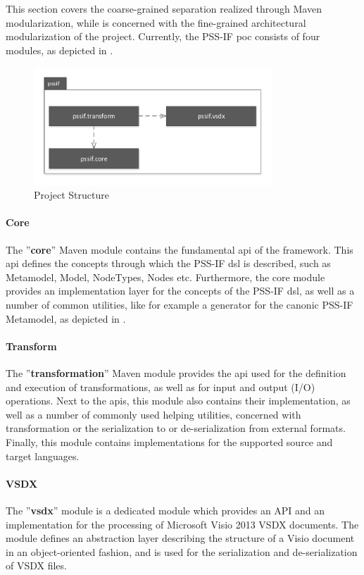 This section covers the coarse-grained separation realized through Maven modularization, while  is concerned with the fine-grained architectural modularization of the project. Currently, the PSS-IF \gls{poc} consists of four modules, as depicted in  .

\begin{figure}
\centering
\includegraphics[width=0.8\textwidth]{figures/project-structure.pdf}
\caption{Project Structure}
\label{fig:structure}
\end{figure}

\paragraph{Core} The ''\textbf{core}'' Maven module contains the fundamental \gls{api} of the framework. This \gls{api} defines the concepts through which the PSS-IF \gls{dsl} is described, such as Metamodel, Model, NodeTypes, Nodes etc. Furthermore, the core module provides an implementation layer for the concepts of the PSS-IF \gls{dsl}, as well as a number of common utilities, like for example a generator for the canonic PSS-IF Metamodel, as depicted in .

\paragraph{Transform} The ''\textbf{transformation}'' Maven module provides the \gls{api} used for the definition and execution of transformations, as well as for input and output (I/O) operations. Next to the \glspl{api}, this module also contains their implementation, as well as a number of commonly used helping utilities, concerned with transformation or the serialization to or de-serialization from external formats. Finally, this module contains implementations for the supported source and target languages.

\paragraph{VSDX} The ''\textbf{vsdx}'' module is a dedicated module which provides an API and an implementation for the processing of Microsoft Visio 2013 VSDX documents. The module defines an abstraction layer describing the structure of a Visio document in an object-oriented fashion, and is used for the serialization and de-serialization of VSDX files.

